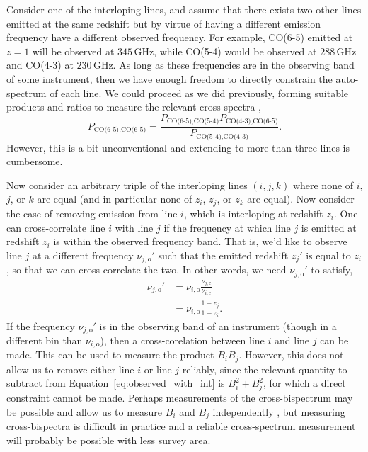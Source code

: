 \documentclass{aastex62}
\newcommand{\GHz}{\ensuremath{\text{GHz}}}
\newcommand{\beq}{\begin{equation}}
\newcommand{\eeq}{\end{equation}}
\newcommand{\mynu}[2]{\ensuremath{\nu_{#1,\text{#2}}}}
\newcommand{\xps}[2]{\ensuremath{P_{#1,#2}}}
\begin{document}
Consider one of the interloping lines, and assume that there exists two other
lines emitted at the same redshift but by virtue of having a different
emission frequency have a different observed frequency. For example, CO(6-5)
emitted at $z=1$ will be observed at $345\,\GHz$, while CO(5-4) would be
observed at $288\,\GHz$ and CO(4-3) at $230\,\GHz$. As long as these
frequencies are in the observing band of some instrument, then we have enough
freedom to directly constrain the auto-spectrum of each line. We could proceed
as we did previously, forming suitable products and ratios to measure the
relevant cross-spectra \citep{2018arXiv181110609B},
\beq\label{eq:old_way}
P_{\text{CO(6-5),CO(6-5)}} = 
\frac{ \xps{\text{CO(6-5)}}{\text{CO(5-4)}} 
       \xps{\text{CO(4-3)}}{\text{CO(6-5)}} }
     { \xps{\text{CO(5-4)}}{\text{CO(4-3)}}}\text{.}
\eeq
However, this is a bit unconventional and extending to more than three lines
is cumbersome.

Now consider an arbitrary triple of the interloping lines $(i, j, k)$ where
none of $i$, $j$, or $k$ are equal (and in particular none of $z_i$, $z_j$, or
$z_k$ are equal). Now consider the case of removing emission from line $i$,
which is interloping at redshift $z_i$. One can cross-correlate line $i$ with
line $j$ if the frequency at which line $j$ is emitted at redshift $z_i$ is
within the observed frequency band. That is, we'd like to observe line $j$ at
a different frequency $\mynu{j}{o}'$ such that the emitted redshift $z_j'$ is
equal to $z_i$, so that we can cross-correlate the two. In other words, we
need $\mynu{j}{o}'$ to satisfy,
\beq\label{eq:nu_obs}
\begin{split}
\mynu{j}{o}' &= \mynu{i}{o} \frac{\mynu{j}{e}}{\mynu{i}{e}} \\
&= \mynu{i}{o} \frac{1+z_j}{1+z_i}\text{.}
\end{split}
\eeq
If the frequency $\mynu{j}{o}'$ is in the observing band of an instrument
(though in a different bin than $\mynu{i}{o}$), then a cross-corelation
between line $i$ and line $j$ can be made. This can be used to measure the
product $B_iB_j$. However, this does not allow us to remove either line $i$ or
line $j$ reliably, since the relevant quantity to subtract from
Equation~\ref{eq:observed_with_int} is $B_i^2 + B_j^2$, for which a direct
constraint cannot be made. Perhaps measurements of the cross-bispectrum may be
possible and allow us to measure $B_i$ and $B_j$ independently
\citep{2018ApJ...867...26B}, but measuring cross-bispectra is difficult in
practice and a reliable cross-spectrum measurement will probably be possible
with less survey area.
\end{document}
